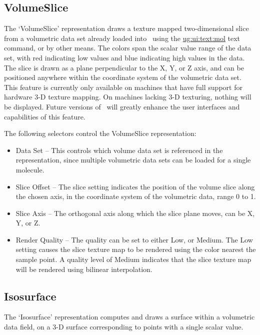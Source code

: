 \subsection{VolumeSlice}
\label{ug:topic:drawmethods:volumeslice}
The `VolumeSlice' representation draws a texture mapped two-dimensional
slice from a volumetric data set already loaded into \VMD\ using the
\hyperref{{\tt mol volume}}{{\tt mol volume} [\S~}{]}{ug:ui:text:mol} text
command, or by other means.  The colors span the scalar value range of the
data set, with red indicating low values and blue indicating high values in
the data.  The slice is drawn as a plane perpendicular to the X, Y, or Z
axis, and can be positioned anywhere within the coordinate system of the
volumetric data set.  This feature is currently only available on machines
that have full support for hardware 3-D texture mapping.  On machines
lacking 3-D texturing, nothing will be displayed.  Future versions of \VMD\
will greatly enhance the user interfaces and capabilities of this feature.

The following  selectors control the VolumeSlice representation: 
\begin{itemize}

\item Data Set -- This controls which volume data set is referenced in the
representation, since multiple volumetric data sets can be loaded for a
single molecule.

\item Slice Offset -- The slice setting indicates the position of the volume
slice along the chosen axis, in the coordinate system of the volumetric
data, range 0 to 1.

\item Slice Axis -- The orthogonal axis along which the slice plane moves,
can be X, Y, or Z.

\item Render Quality -- The quality can be set to either {\sf Low}, or 
{\sf Medium}.  The {\sf Low} setting causes the slice texture map 
to be rendered using the color nearest the sample point.  
A quality level of {\sf Medium} indicates that the
slice texture map will be rendered using bilinear interpolation.

\end{itemize}


\subsection{Isosurface}
\label{ug:topic:drawmethods:isosurface}
The `Isosurface' representation computes and draws a surface within
a volumetric data field, on a 3-D surface corresponding to points
with a single scalar value.  


